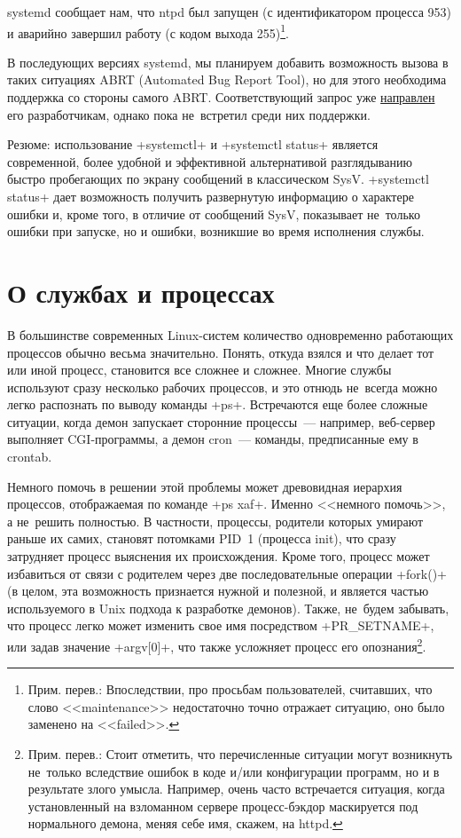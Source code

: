 \documentclass[10pt,oneside,a4paper]{article}
\begin{document}
systemd сообщает нам, что ntpd был запущен (с идентификатором процесса 953) и
аварийно завершил работу (с кодом выхода 255)\footnote{Прим. перев.:
Впоследствии, про просьбам пользователей, считавших, что слово <<maintenance>>
недостаточно точно отражает ситуацию, оно было заменено на <<failed>>.}.

В последующих версиях systemd, мы планируем добавить возможность вызова в
таких ситуациях ABRT (Automated Bug Report Tool), но для этого необходима
поддержка со стороны самого ABRT. Соответствующий запрос уже
\href{https://bugzilla.redhat.com/show_bug.cgi?id=622773}{направлен} его
разработчикам, однако пока не~встретил среди них поддержки.

Резюме: использование +systemctl+ и +systemctl status+ является современной,
более удобной и эффективной альтернативой разглядыванию быстро пробегающих по
экрану сообщений в классическом SysV. +systemctl status+ дает возможность
получить развернутую информацию о характере ошибки и, кроме того, в отличие
от сообщений SysV, показывает не~только ошибки при запуске, но и ошибки,
возникшие во время исполнения службы. 

\section{О службах и процессах}
\label{sec:cgls}

В большинстве современных Linux-систем количество одновременно работающих
процессов обычно весьма значительно. Понять, откуда взялся и что делает тот
или иной процесс, становится все сложнее и сложнее. Многие службы используют
сразу несколько рабочих процессов, и это отнюдь не~всегда можно легко
распознать по выводу команды +ps+. Встречаются еще более сложные ситуации,
когда демон запускает сторонние процессы~--- например, веб-сервер выполняет
CGI-программы, а демон cron~--- команды, предписанные ему в crontab.

Немного помочь в решении этой проблемы может древовидная иерархия процессов,
отображаемая по команде +ps xaf+. Именно <<немного помочь>>, а не~решить
полностью. В частности, процессы, родители которых умирают раньше их самих,
становят потомками PID~1 (процесса init), что сразу затрудняет процесс
выяснения их происхождения. Кроме того, процесс может избавиться от связи с
родителем через две последовательные операции +fork()+ (в целом, эта возможность
признается нужной и полезной, и является частью используемого в Unix подхода
к разработке демонов). Также, не~будем забывать, что процесс легко может
изменить свое имя посредством +PR_SETNAME+, или задав значение
+argv[0]+, что также усложняет процесс его опознания\footnote{Прим.
перев.: Стоит отметить, что перечисленные ситуации могут возникнуть не~только
вследствие ошибок в коде и/или конфигурации программ, но и в результате злого
умысла. Например, очень часто встречается ситуация, когда установленный на
взломанном сервере процесс-бэкдор маскируется под нормального демона, меняя
себе имя, скажем, на httpd.}.
\end{document}
